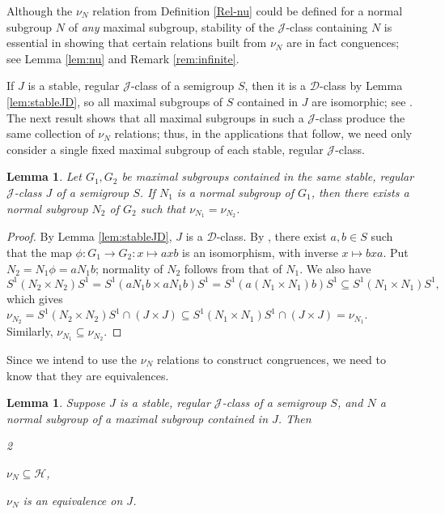 \documentclass[11pt,a4paper]{article}
\renewcommand{\H}{\mathrel{\mathscr H}}
\newcommand{\D}{\mathrel{\mathscr D}}
\newcommand{\gJ}{\mathrel{\mathscr J}}
\newcommand{\1}{\id_n}
\newcommand{\mt}{\mapsto}
\newcommand{\sub}{\subseteq}
\newcommand{\bit}{\begin{itemize}}
\newcommand{\eit}{\end{itemize}}
\newcommand{\itemit}[1]{\item[\emph{(#1)}]}
\newcommand{\pf}{\begin{proof}}
\newcommand{\epf}{\end{proof}}
\numberwithin{equation}{section}
\newtheorem{lemma}[equation]{Lemma}
\theoremstyle{definition}
\newtheorem{rem}[equation]{Remark}
\begin{document}
Although the $\nu_N$ relation from Definition \ref{Rel-nu} could be defined for a normal subgroup $N$ of \emph{any} maximal subgroup, stability of the $\gJ$-class containing $N$ is essential in showing that certain relations built from $\nu_N$ are in fact conguences; see Lemma \ref{lem:nu} and Remark \ref{rem:infinite}.

%
If $J$ is a stable, regular $\gJ$-class of a semigroup $S$, then it is a $\D$-class by Lemma \ref{lem:stableJD}, so all maximal subgroups of $S$ contained in $J$ are isomorphic; see \cite[Theorem 2.20]{CPbook}.  The next result shows that all maximal subgroups in such a $\gJ$-class produce the same collection of $\nu_N$ relations; thus, in the applications that follow, we need only consider a single fixed maximal subgroup of each stable, regular $\gJ$-class.

\begin{lemma}\label{lem:G1G2}
Let $G_1,G_2$ be maximal subgroups contained in the same stable, regular $\gJ$-class $J$ of a semigroup $S$.  If $N_1$ is a normal subgroup of $G_1$, then there exists a normal subgroup $N_2$ of $G_2$ such that $\nu_{N_1}=\nu_{N_2}$.
\end{lemma}

\pf
By Lemma \ref{lem:stableJD}, $J$ is a $\D$-class.
By \cite[Theorem 2.20]{CPbook}, there exist $a,b\in S$ such that the map ${\phi:G_1\to G_2:x\mt axb}$ is an isomorphism, with inverse $x\mt bxa$.  
Put $N_2=N_1\phi=aN_1b$; normality of $N_2$ follows from that of $N_1$.  We also have
\[
S^1(N_2\times N_2)S^1 = S^1(aN_1b\times aN_1b)S^1 = S^1(a(N_1\times N_1)b)S^1 \sub S^1(N_1\times N_1)S^1,
\]
which gives $\nu_{N_2} = S^1(N_2\times N_2)S^1 \cap (J\times J) \sub S^1(N_1\times N_1)S^1 \cap (J\times J) = \nu_{N_1}$.  Similarly, $\nu_{N_1}\sub\nu_{N_2}$.
\epf

Since we intend to use the $\nu_N$ relations to construct congruences, we need to know that they are equivalences.

\begin{lemma}\label{lem:nu_H_equivalence}
Suppose $J$ is a stable, regular $\gJ$-class of a semigroup $S$, and $N$ a normal subgroup of a maximal subgroup contained in $J$.  Then
\bit\begin{multicols}2
\itemit{i} $\nu_N\sub{\H}$,
\itemit{ii} $\nu_N$ is an equivalence on $J$.
\end{multicols}\eit
\end{lemma}
\end{document}
